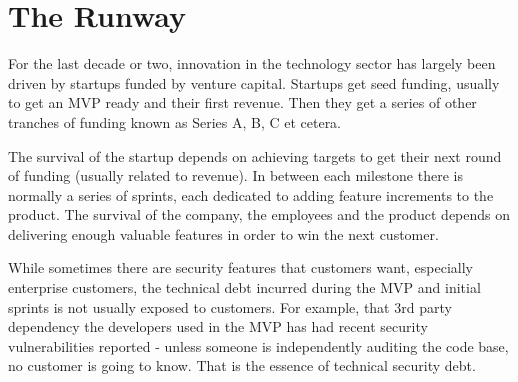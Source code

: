 \documentclass{article}
\begin{document}
\section{The Runway}
For the last decade or two, innovation in the technology sector has largely been driven by startups funded by venture capital. Startups get seed funding, usually to get an MVP ready and their first revenue.  Then they get a series of other tranches of funding known as Series A, B, C et cetera.
\par
The survival of the startup depends on achieving targets to get their next round of funding (usually related to revenue). In between each milestone there is normally a series of sprints, each dedicated to adding feature increments to the product. The survival of the company, the employees and the product depends on delivering enough valuable features in order to win the next customer.
\par
While sometimes there are security features that customers want, especially enterprise customers, the technical debt incurred during the MVP and initial sprints is not usually exposed to customers. For example, that 3rd party dependency the developers used in the MVP has had recent security vulnerabilities reported - unless someone is independently auditing the code base, no customer is going to know. That is the essence of technical security debt.
\par
\end{document}
